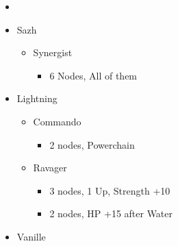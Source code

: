 \newpage
\renewcommand{\first}{[1] Relentless Assault (\rav/\com/\rav)}
\renewcommand{\second}{[2] Bully (\syn/\com/\sab)}
\renewcommand{\third}{[3] Relentless Assault (\rav/\com/\rav)}
\renewcommand{\fourth}{[4] Smart Bomb (\rav/\rav/\sab)}
\renewcommand{\fifth}{[5] Tri-Disaster (\rav/\rav/\rav)}
\renewcommand{\sixth}{[6] Malevolence (\syn/\rav/\rav)}
\begin{multicols}{2}
	\begin{menu}
		\begin{itemize}
			\paradigm
			\begin{itemize}
				\item {}%
				      {\paradigmline{\rav}{\com}{\rav}}%
				      {\paradigmline{\syn}{\com}{\sab}}%
				      {\paradigmline{\rav}{\com}{(\rav)}}%
				      {\paradigmline[4]{\textit{\rav}}{\textit{\rav}}{\textit{\sab}}}%
				      {\paradigmline{\rav}{[\rav]}{\rav}}%
				      {\paradigmline{[\syn]}{[\rav]}{\rav}}
			\end{itemize}
			\columnbreak
			\crystarium
			\begin{itemize}
				\item Sazh
				      \begin{itemize}
					      \item Synergist
					            \begin{itemize}
						            \item 6 Nodes, All of them
					            \end{itemize}
				      \end{itemize}
				\item Lightning
				      \begin{itemize}
					      \item Commando
					            \begin{itemize}
						            \item 2 nodes, Powerchain
					            \end{itemize}
					      \item Ravager
					            \begin{itemize}
						            \item 3 nodes, 1 Up, Strength +10
						            \item 2 nodes, HP +15 after Water
					            \end{itemize}
				      \end{itemize}
				\item Vanille

\end{itemize}
\end{itemize}
\end{menu}
\end{multicols}
